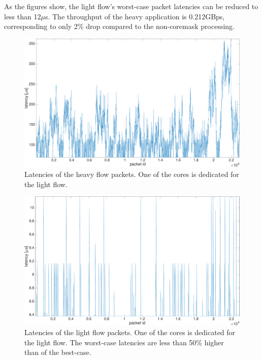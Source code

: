 As the figures show, the light flow's worst-case packet latencies can be reduced to less than 12$\mu$s. The throughput of the heavy application is 0.212GBps, corresponding to only 2\% drop compared to the non-coremask processing.

\begin{figure}[]
  \begin{center}
    \includegraphics[width=\textwidth]{images/experiment/exp2-app1-is-coremask-latency.pdf}
    \caption{Latencies of the heavy flow packets. One of the cores is dedicated for the light flow.}
    \label{fig:exp2-app1-is-coremask-latency}
  \end{center}
\end{figure}

\begin{figure}[]
  \begin{center}
    \includegraphics[width=\textwidth]{images/experiment/exp2-app2-is-coremask-latency.pdf}
    \caption{Latencies of the light flow packets. One of the cores is dedicated for the light flow. The worst-case latencies are less than 50\% higher than of the best-case.}
    \label{fig:exp2-app2-is-coremask-latency}
  \end{center}
\end{figure}

